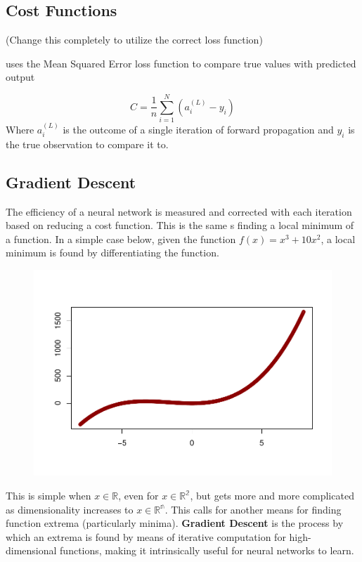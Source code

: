 \hypertarget{cost-functions}{%
\subsection{Cost Functions}\label{cost-functions}}

(Change this completely to utilize the correct loss function)

uses the Mean Squared Error loss function to compare true values with
predicted output

\[
C = \frac{1}{n} \sum_{i=1}^N (a^{(L)}_i - y_i)
\] Where \(a^{(L)}_i\) is the outcome of a single iteration of forward
propagation and \(y_i\) is the true observation to compare it to.

\hypertarget{gradient-descent}{%
\subsection{Gradient Descent}\label{gradient-descent}}

The efficiency of a neural network is measured and corrected with each
iteration based on reducing a cost function. This is the same s finding
a local minimum of a function. In a simple case below, given the
function \(f(x) = x^3 + 10x^2\), a local minimum is found by
differentiating the function.

\begin{figure}
    \centering
    \includegraphics[width = .7\textwidth]{Figures/grad_desc_2D-1.pdf}
\end{figure}

This is simple when \(x \in \mathbb{R}\), even for
\(x \in \mathbb{R^2}\), but gets more and more complicated as
dimensionality increases to \(x \in \mathbb{R^n}\). This calls for
another means for finding function extrema (particularly minima).
\textbf{Gradient Descent} is the process by which an extrema is found by
means of iterative computation for high-dimensional functions, making it
intrinsically useful for neural networks to learn.

